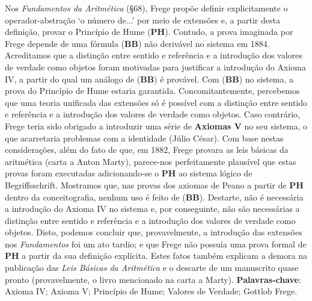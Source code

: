 \documentclass[12pt]{abntex2}
\begin{document}
\begin{resumo} 
Nos \textit{Fundamentos da Aritmética} (§68), Frege propõe definir explicitamente o operador-abstração `o número de...' por meio de extensões e, a partir desta definição, provar o Princípio de Hume (\textbf{PH}). Contudo, a prova imaginada por Frege depende de uma fórmula (\textbf{BB}) não derivável no sistema em 1884. Acreditamos que a distinção entre sentido e referência e a introdução dos valores de verdade como objetos foram motivadas para justificar a introdução do Axioma IV, a partir do qual um análogo de (\textbf{BB}) é provável. Com (\textbf{BB}) no sistema, a prova do Princípio de Hume estaria garantida. Concomitantemente, percebemos que uma teoria unificada das extensões só é possível com a distinção entre sentido e referência e a introdução dos valores de verdade como objetos. Caso contrário, Frege teria sido obrigado a introduzir uma série de \textbf{Axiomas V} no seu sistema, o que acarretaria problemas com a identidade (Júlio César). Com base nestas considerações, além do fato de que, em 1882, Frege provara as leis básicas da aritmética (carta a Anton Marty), parece-nos perfeitamente plausível que estas provas foram executadas adicionando-se o \textbf{PH} ao sistema lógico de Begriffsschrift. Mostramos que, nas provas dos axiomas de Peano a partir de \textbf{PH} dentro da conceitografia, nenhum uso é feito de (\textbf{BB}). Destarte, não é necessária a introdução do Axioma IV no sistema e, por conseguinte, não são necessárias a distinção entre sentido e referência e a introdução dos valores de verdade como objetos. Disto, podemos concluir que, provavelmente, a introdução das extensões nos \textit{Fundamentos} foi um ato tardio; e que Frege não possuía uma prova formal de \textbf{PH} a partir da sua definição explícita. Estes fatos também explicam a demora na publicação das \textit{Leis Básicas da Aritmética} e o descarte de um manuscrito quase pronto (provavelmente, o livro mencionado na carta a Marty). 
\vspace{\onelineskip} 
\noindent 
\textbf{Palavras-chave}: Axioma IV; Axioma V; Princípio de Hume; Valores de Verdade; Gottlob Frege. 
\end{resumo} 
\end{document}
